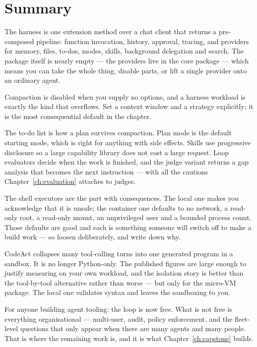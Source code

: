 \section{Summary}

The harness is one extension method over a chat client that returns a
pre-composed pipeline: function invocation, history, approval, tracing, and
providers for memory, files, to-dos, modes, skills, background delegation and
search. The package itself is nearly empty --- the providers live in the core
package --- which means you can take the whole thing, disable parts, or lift a
single provider onto an ordinary agent.

Compaction is disabled when you supply no options, and a harness workload is
exactly the kind that overflows. Set a context window and a strategy explicitly;
it is the most consequential default in the chapter.

The to-do list is how a plan survives compaction. Plan mode is the default
starting mode, which is right for anything with side effects. Skills use
progressive disclosure so a large capability library does not cost a large
request. Loop evaluators decide when the work is finished, and the judge variant
returns a gap analysis that becomes the next instruction --- with all the
cautions Chapter~\ref{ch:evaluation} attaches to judges.

The shell executors are the part with consequences. The local one makes you
acknowledge that it is unsafe; the container one defaults to no network, a
read-only root, a read-only mount, an unprivileged user and a bounded process
count. Those defaults are good and each is something someone will switch off to
make a build work --- so loosen deliberately, and write down why.

CodeAct collapses many tool-calling turns into one generated program in a
sandbox. It is no longer Python-only. The published figures are large enough to
justify measuring on your own workload, and the isolation story is better than
the tool-by-tool alternative rather than worse --- but only for the micro-VM
package. The local one validates syntax and leaves the sandboxing to you.

For anyone building agent tooling: the loop is now free. What is not free is
everything organisational --- multi-user, audit, policy enforcement, and the
fleet-level questions that only appear when there are many agents and many
people. That is where the remaining work is, and it is what
Chapter~\ref{ch:capstone} builds.
